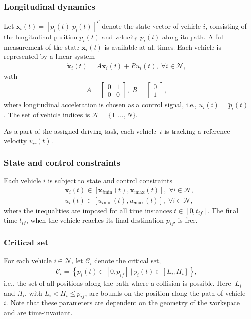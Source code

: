\documentclass[letterpaper,10pt,conference]{ieeeconf}
\begin{document}
\subsubsection{Longitudinal dynamics}
Let \mbox{$\mathbf{x}_i(t)=[p_i(t) \; \dot p_i(t)]^T$} denote the state vector of vehicle $i$, consisting of the longitudinal position $p_i(t)$ and velocity $\dot p_i(t)$ along its path. A full measurement of the state $\mathbf{x}_i(t)$ is available at all times. Each vehicle is represented by a linear system
\begin{align}\label{eq:linsys1}
\mathbf{\dot x}_i(t)=A \mathbf{x}_i(t)+ B u_i(t), \; \forall i \in \mathcal{N},
\end{align}
with
\begin{align}
A=\left[\begin{array}{ccc} 0 & 1\\ 0 & 0 \end{array}\right], \; B=\left[\begin{array}{c} 0\\ 1 \end{array}\right],
\end{align}
where longitudinal acceleration is chosen as a control signal, i.e., $u_i(t)=\ddot p_i(t)$. The set of vehicle indices is \mbox{$\mathcal{N}=\{1,...,N \}$}.

As a part of the assigned driving task, each vehicle~$i$ is tracking a reference velocity $v_{ir}(t)$.

\subsubsection{State and control constraints} Each vehicle $i$ is subject to state and control constraints
\begin{align} \label{eq:statecstr}
&\mathbf{x}_i(t) \in [\mathbf{x}_{i\text{min}}(t), \mathbf{x}_{i\text{max}}(t)], \; \forall i \in \mathcal{N},\\
&u_i(t) \in [u_{i\text{min}}(t), u_{i\text{max}}(t)], \; \forall i \in \mathcal{N},
\end{align}
where the inequalities are imposed for all time instances \mbox{$t \in [0, t_{if}]$}. The final time $t_{if}$, when the vehicle reaches its final destination $p_{if}$, is free. 
\subsubsection{Critical set} For each vehicle $i \in \mathcal{N}$, let $\mathcal{C}_i$ denote the critical set,
\begin{align}
\mathcal{C}_i = \left\{ p_i(t)\in [0, p_{if}]\ |\ p_i(t)\in [L_i,H_i] \right\},
\end{align}
i.e., the set of all positions along the path where a collision is possible. Here, $L_i$ and $H_i$, with $L_i < H_i \leq p_{if}$, are bounds on the position along the path of vehicle $i$. Note that these parameters are dependent on the geometry of the workspace and are time-invariant.
\end{document}

